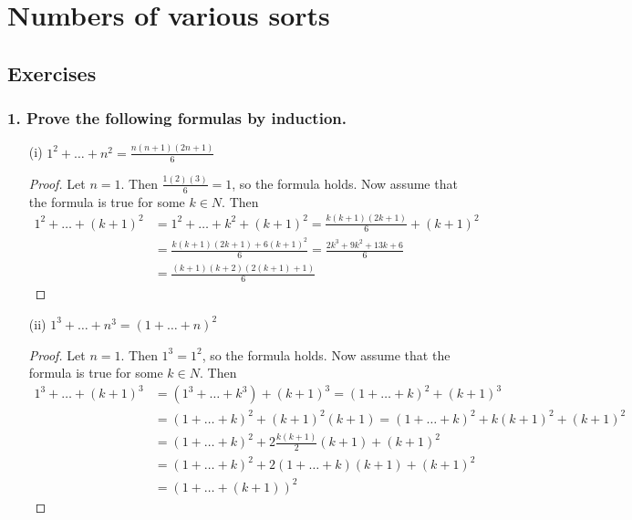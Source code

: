 \documentclass{article}
\begin{document}
\section*{Numbers of various sorts}

\subsection*{Exercises}

\subsubsection*{1. Prove the following formulas by induction.}
\begin{enumerate}
	\item[(i)] $1^2 + \dots + n^2 = \frac{n(n + 1)(2n + 1)}{6}$
	\begin{proof}
		Let $n = 1$. Then $\frac{1(2)(3)}{6} = 1$, so the formula holds. Now assume that the formula is true for some $k \in N$. Then 
		\begin{align*}	
			1^2 + \dots + (k + 1)^2 &= 1^2 + \dots + k^2 + (k + 1)^2 = \frac{k(k + 1)(2k + 1)}{6} + (k + 1)^2 \\&= \frac{k(k + 1)(2k + 1) + 6(k + 1)^2}{6} = \frac{2k^3 + 9k^2 + 13k + 6}{6} \\&= \frac{(k + 1)(k + 2)(2(k + 1) + 1)}{6}
		\end{align*}
	\end{proof}
	\item[(ii)] $1^3 + \dots + n^3 = (1 + \dots + n)^2$
	\begin{proof}
		Let $n = 1$. Then $1^3 = 1^2$, so the formula holds. Now assume that the formula is true for some $k \in N$. Then
		\begin{align*}
			1^3 + \dots + (k + 1)^3 &= (1^3 + \dots + k^3) + (k + 1)^3 = (1 + \dots + k)^2 + (k + 1)^3 \\&= (1 + \dots + k)^2 + (k + 1)^2(k + 1) = (1 + \dots + k)^2 + k(k + 1)^2 + (k + 1)^2 \\&= (1 + \dots + k)^2 + 2\frac{k(k + 1)}{2}(k + 1) + (k + 1)^2 \\&= (1 + \dots + k)^2 + 2(1 + \dots + k)(k + 1) + (k + 1)^2 \\&= (1 + \dots + (k + 1))^2
		\end{align*}
	\end{proof}
\end{enumerate}
\end{document}
